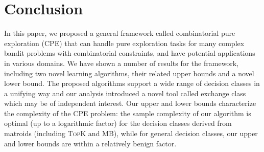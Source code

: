 \documentclass{article}
\newcommand{\Algorithm}{{\small \textsf{CLUCB}}\xspace}
\newcommand{\AlgorithmBud}{{\small \textsf{CSAR}}\xspace}
\newcommand{\Problem}{{CPE}\xspace}
\newcommand{\MultiIdent}{\textsc{TopK}\xspace}
\newcommand{\MultiBandit}{\textsc{MB}\xspace}
\begin{document}
\section{Conclusion}
\vspace{-1em}
In this paper, we proposed a general framework called combinatorial pure exploration (CPE) that
	can handle pure exploration tasks for many complex bandit problems with combinatorial constraints, and
	have potential applications in various domains.
We have shown a number of results for the framework, including two novel learning algorithms, their related upper bounds and a novel lower bound.
The proposed algorithms support a wide range of decision classes in a unifying way and our analysis introduced a novel tool called exchange class which may be of independent interest.
Our upper and lower bounds characterize the complexity of the \Problem problem: the sample complexity of our algorithm is optimal (up to a logarithmic factor) for the decision classes derived from matroids (including \MultiIdent and \MultiBandit), while for general decision classes, our upper and lower bounds are within a relatively benign factor.





\newpage
{\small


}
\newpage
\appendix
\end{document}
